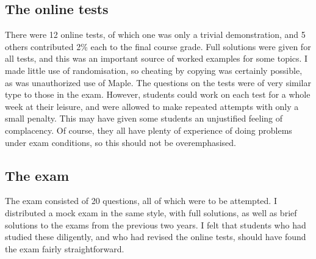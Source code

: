 \documentclass{amsart}
\begin{document}
\subsection*{The online tests}

There were 12 online tests, of which one was only a trivial
demonstration, and 5 others contributed 2\% each to the final course
grade.  Full solutions were given for all tests, and this was an
important source of worked examples for some topics.  I made little
use of randomisation, so cheating by copying was certainly possible,
as was unauthorized use of Maple.  The questions on the tests were of
very similar type to those in the exam.  However, students could work
on each test for a whole week at their leisure, and were allowed to
make repeated attempts with only a small penalty.  This may have given
some students an unjustified feeling of complacency.  Of course, they
all have plenty of experience of doing problems under exam conditions,
so this should not be overemphasised.

\subsection*{The exam}

The exam consisted of 20 questions, all of which were to be
attempted.  I distributed a mock exam in the same style, with full
solutions, as well as brief solutions to the exams from the previous
two years.  I felt that students who had studied these diligently, and
who had revised the online tests, should have found the exam fairly
straightforward. 
\end{document}
